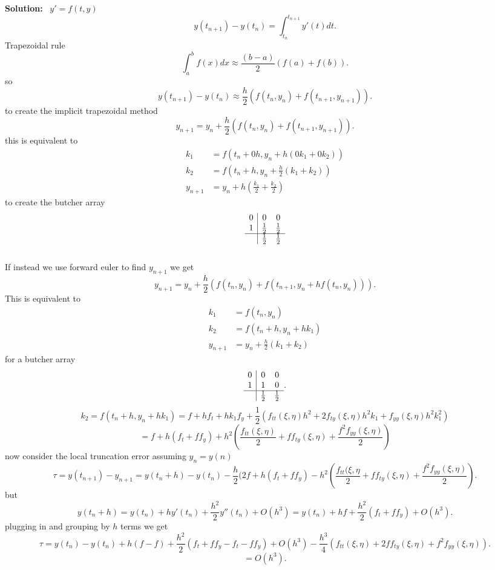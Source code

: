 \documentclass[a4paper,12pt]{scrartcl} %
\newenvironment{solution}
  {\par\color{answercolor}\textbf{Solution:}\ }
  {\par}
\theoremstyle{darktheorem}
\begin{document}
\begin{solution}
    $y' = f(t,y)$
    \[
        y(t_{n+1}) - y(t_n) = \int_{t_n}^{t_{n+1}}y'(t)dt
    .\] 
    Trapezoidal rule
    \[
    \int_{a}^{b}f(x)dx \approx \frac{(b-a)}{2}(f(a) + f(b))
    .\] 
    so
    \[
        y(t_{n+1}) - y(t_n) \approx \frac{h}{2}(f(t_n,y_n) + f(t_{n+1},y_{n+1}))
    .\] 
    to create the implicit trapezoidal method
    \[
        y_{n+1} = y_n + \frac{h}{2}(f(t_n,y_n) + f(t_{n+1},y_{n+1}))
    .\] 
    this is equivalent to
    \begin{align*}
        k_1 &= f(t_n+0h,y_n+h(0k_1 + 0k_2))\\
        k_2 &= f(t_n + h, y_n + \frac{h}{2}(k_1 + k_2))\\
        y_{n+1} &= y_n + h(\frac{k_1}{2} + \frac{k_2}{2})
    \end{align*}
    to create the butcher array
    \[
    \begin{array}{c|cc}
    0   & 0 & 0 \\
    1   & \frac{1}{2} & \frac{1}{2} \\
    \hline
        & \frac{1}{2} & \frac{1}{2}
    \end{array}
    \]
    \\
    If instead we use forward euler to find $y_{n+1}$ we get
    \[
        y_{n+1} = y_n + \frac{h}{2}(f(t_n,y_n) + f(t_{n+1}, y_n + hf(t_n,y_n)))
    .\] 
    This is equivalent to
    \begin{align*}
        k_1 &= f(t_n,y_n)\\
        k_2 &= f(t_n + h, y_n + hk_1)\\
        y_{n+1} &= y_n + \frac{h}{2}(k_1 + k_2)
    \end{align*}
    for a butcher array 
    \[
    \begin{array}{c|cc}
        0 & 0 & 0\\
        1 & 1 & 0\\
        \hline
          & \frac{1}{2} & \frac{1}{2}
    \end{array}
    .\] 
    \[
        k_2 = f(t_n + h, y_n + hk_1) = f + hf_t + hk_1f_y + \frac{1}{2}(f_{tt}(\xi,\eta)h^2 + 2f_{ty}(\xi,\eta)h^2k_1 + f_{yy}(\xi,\eta)h^2k_1^2)  
    \] 
    \[
        =f + h(f_t + ff_y) + h^2(\frac{f_{tt}(\xi,\eta)}{2} + ff_{ty}(\xi,\eta) + \frac{f^2f_{yy}(\xi,\eta)}{2})
    \] 
    now consider the local truncation error assuming $y_n = y(n)$
    \[
        \tau = y(t_{n+1}) - y_{n+1} = y(t_n + h) - y(t_n) - \frac{h}{2}(2f + h(f_t + ff_y) -h^2(\frac{f_{tt}(\xi,\eta}{2} + ff_{ty}(\xi,\eta) + \frac{f^2f_{yy}(\xi,\eta)}{2})
    .\] 
    but
    \[
    y(t_n + h) = y(t_n) + hy'(t_n) + \frac{h^2}{2}y''(t_n) + O(h^{3}) = y(t_n) + hf + \frac{h^2}{2}(f_t + ff_y) + O(h^{3})
    .\] 
    plugging in and grouping by $h$ terms we get
    \[
        \tau = y(t_n) - y(t_n) + h(f-f) + \frac{h^2}{2}(f_t+ff_y -f_t-ff_y) + O(h^{3}) -\frac{h^{3}}{4}(f_{tt}(\xi,\eta) + 2f f_{ty}(\xi,\eta) + f^2f_{yy}(\xi,\eta))
    .\] 
    \[
    = O(h^{3})
    .\] 

\end{solution}
\end{document}
